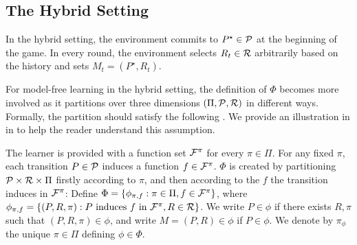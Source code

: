 
\subsection{The Hybrid Setting}
\begin{definition}\label{def: hybrid sett} In the hybrid setting, the environment commits to $P^\star\in\mathcal{P}$ at the beginning of the game. In every round, the environment selects $R_t\in\mathcal{R}$ arbitrarily based on the history and sets $M_t=(P^\star, R_t)$. 
\end{definition}
For model-free learning in the hybrid setting, the definition of $\Phi$ becomes more involved as it partitions over three dimensions $(\Pi, \mathcal{P}, \mathcal{R})$ in different ways. Formally, the partition should satisfy the following . We provide an illustration in  in  to help the reader understand this assumption. 


\begin{assumption}\label{assum: function approximation hybrid}
     The learner is provided with a function set $\mathcal{F}^\pi$ for every $\pi\in\Pi$. For any fixed $\pi$, each transition $P\in\mathcal{P}$ induces a function $f\in\mathcal{F}^\pi$. $\Phi$ is created by partitioning $\mathcal{P}\times \mathcal{R}\times \Pi$ firstly according to $\pi$, and then according to the $f$ the transition induces in $\mathcal{F}^\pi$: Define $\Phi=\{\phi_{\pi, f}:  \pi\in\Pi, f\in\mathcal{F}^\pi\}$, where $\phi_{\pi, f}=\{(P, R, \pi): P \text{\ induces\ } f \text{\ in\ }\mathcal{F}^\pi, R\in\mathcal{R}\}$. We write $P\in\phi$ if there exists $R, \pi$ such that $(P, R, \pi)\in\phi$, and write $M=(P,R)\in\phi$ if $P\in\phi$. We denote by $\pi_\phi$ the unique $\pi\in\Pi$ defining $\phi\in\Phi$.      
\end{assumption}

